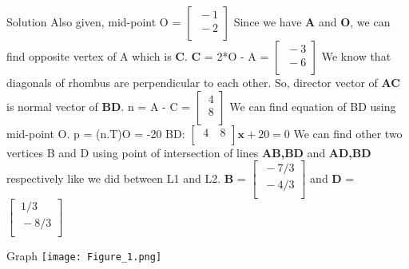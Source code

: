 \documentclass{beamer}
\begin{document}
\begin{frame}{Solution}
Also given, mid-point O = 
$ 
\begin{bmatrix}
  \ -1 \\
  \ -2 \\
\end{bmatrix}
$ 
\newline
Since we have \textbf{A} and \textbf{O}, we can find opposite vertex of A which is \textbf{C}.
\newline
\textbf{C} = 2*O - A = 
$ 
\begin{bmatrix}
  \ -3 \\
  \ -6 \\
\end{bmatrix}
$ 
\newline
We know that diagonals of rhombus are perpendicular to each other. So, director vector of \textbf{AC} is normal vector of \textbf{BD}.
\newline
n = A - C = 
$ 
\begin{bmatrix}
  \ 4 \\
  \ 8 \\
\end{bmatrix}
$ 
\newline
We can find equation of BD using mid-point O.
\newline
p = (n.T)O = -20
\newline
BD:
$ \begin{bmatrix}
  \ 4 &
  \ 8 \\
\end{bmatrix}
\textbf{x} + 20 = 0 $ 
\newline
We can find other two vertices B and D using point of intersection of lines \textbf{AB,BD} and \textbf{AD,BD} respectively like we did between L1 and L2.
\newline
\textbf{B} = 
$ 
\begin{bmatrix}
  \ -7/3 \\
  \ -4/3 \\
\end{bmatrix}
$ \hspace{20}
and  \hspace{20}
\textbf{D} = 
$ 
\begin{bmatrix}
  \ 1/3 \\
  \ -8/3 \\
\end{bmatrix}
$

\end{frame}

\begin{frame}{Graph}
\centering
\texttt{[image: Figure\_1.png]}
\end{frame}
\end{document}
